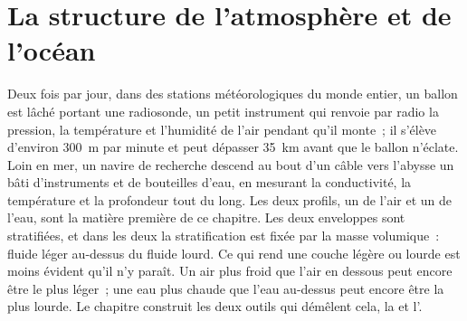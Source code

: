 \chapter{La structure de l'atmosphère et de l'océan}\label{ch:b1:fluid-envelopes-structure}

Deux fois par jour, dans des stations météorologiques du monde entier, un ballon est lâché portant
une radiosonde, un petit instrument qui renvoie par radio la pression, la température
et l'humidité de l'air pendant qu'il monte~; il s'élève d'environ \qty{300}{m} par minute
et peut dépasser \qty{35}{km} avant que le ballon n'éclate. Loin en mer, un navire de
recherche descend au bout d'un câble vers l'abysse un bâti d'instruments et de bouteilles d'eau,
en mesurant la conductivité, la température et la profondeur tout du long. Les deux
profils, un de l'air et un de l'eau, sont la matière première de ce
chapitre. Les deux enveloppes sont stratifiées, et dans les deux la stratification est fixée par la masse volumique~:
fluide léger au-dessus du fluide lourd. Ce qui rend une couche légère ou lourde est moins évident
qu'il n'y paraît. Un air plus froid que l'air en dessous peut encore être le plus léger~;
une eau plus chaude que l'eau au-dessus peut encore être la plus lourde. Le
chapitre construit les deux outils qui démêlent cela, la  et
l'.

